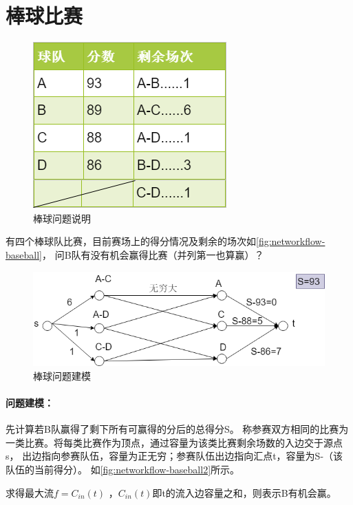 \section{棒球比赛}
\begin{figure}[htb]
	\centering
	\includegraphics[scale=0.6]{image/networkflow5.png}
	\caption{棒球问题说明}\label{fig:networkflow-baseball}
\end{figure}
\begin{example}
	有四个棒球队比赛，目前赛场上的得分情况及剩余的场次如\autoref{fig:networkflow-baseball}，
	问B队有没有机会赢得比赛（并列第一也算赢）？
\end{example}

\begin{figure}[h]
	\centering
	\includegraphics[scale=0.6]{image/networkflow6.png}
	\caption{棒球问题建模}\label{fig:networkflow-baseball2}
\end{figure}

\paragraph*{问题建模：}先计算若B队赢得了剩下所有可赢得的分后的总得分S。
称参赛双方相同的比赛为一类比赛。将每类比赛作为顶点，通过容量为该类比赛剩余场数的入边交于源点s，
出边指向参赛队伍，容量为正无穷；参赛队伍出边指向汇点t，容量为S-（该队伍的当前得分）。
如\autoref{fig:networkflow-baseball2}所示。

求得最大流\(f = C_{in}(t)\) ，\(C_{in}(t)\)即t的流入边容量之和，则表示B有机会赢。

